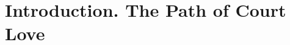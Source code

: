 \documentclass[a4paper,12pt,twoside]{book}
\begin{document}
\let\tmp\oddsidemargin
\let\oddsidemargin\evensidemargin
\let\evensidemargin\tmp
\reversemarginpar


\providecommand{\flright}[1]{\begin{flushright}#1\end{flushright}}
\providecommand{\flrightit}[1]{\begin{flushright}\itshape #1\end{flushright}}
{}

\pagestyle{fancy}
\renewcommand{\sectionmark}[1]{\markright{#1}}
\renewcommand{\chaptermark}[1]{\markboth{#1}{}}

%

\frontmatter
%

%

\tableofcontents

\mainmatter

\fancyhf{}
\fancyhead[LE]{\small \thepage$\quad${\scshape\chaptername{} \thechapter}: \nouppercase{\itshape\leftmark}}




\chapter{Introduction. The Path of Court Love}







\end{document}
